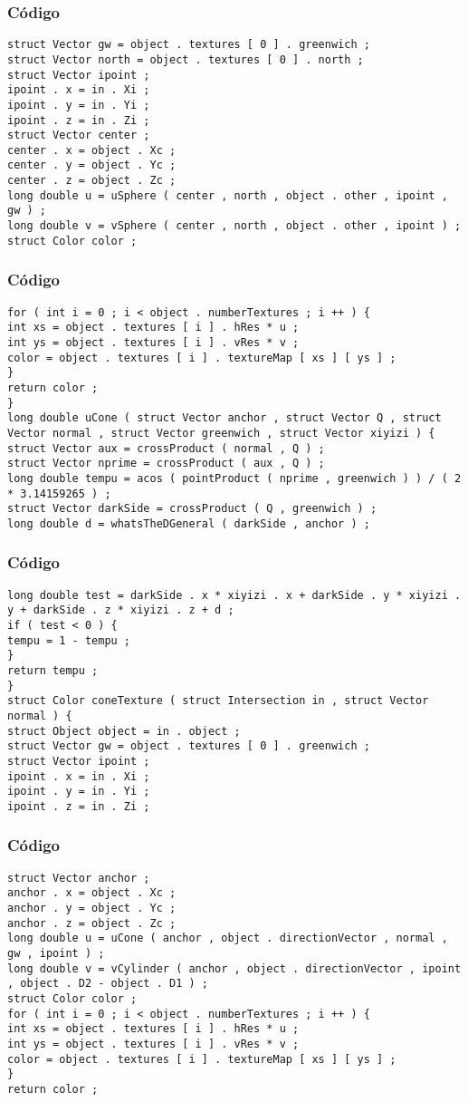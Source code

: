 \documentclass{beamer}
\begin{document}
\begin{frame}[fragile]
\frametitle{C\'odigo}
\begin{verbatim}
struct Vector gw = object . textures [ 0 ] . greenwich ; 
struct Vector north = object . textures [ 0 ] . north ; 
struct Vector ipoint ; 
ipoint . x = in . Xi ; 
ipoint . y = in . Yi ; 
ipoint . z = in . Zi ; 
struct Vector center ; 
center . x = object . Xc ; 
center . y = object . Yc ; 
center . z = object . Zc ; 
long double u = uSphere ( center , north , object . other , ipoint , gw ) ; 
long double v = vSphere ( center , north , object . other , ipoint ) ; 
struct Color color ; 
\end{verbatim}
\end{frame}
\begin{frame}[fragile]
\frametitle{C\'odigo}
\begin{verbatim}
for ( int i = 0 ; i < object . numberTextures ; i ++ ) { 
int xs = object . textures [ i ] . hRes * u ; 
int ys = object . textures [ i ] . vRes * v ; 
color = object . textures [ i ] . textureMap [ xs ] [ ys ] ; 
} 
return color ; 
} 
long double uCone ( struct Vector anchor , struct Vector Q , struct Vector normal , struct Vector greenwich , struct Vector xiyizi ) { 
struct Vector aux = crossProduct ( normal , Q ) ; 
struct Vector nprime = crossProduct ( aux , Q ) ; 
long double tempu = acos ( pointProduct ( nprime , greenwich ) ) / ( 2 * 3.14159265 ) ; 
struct Vector darkSide = crossProduct ( Q , greenwich ) ; 
long double d = whatsTheDGeneral ( darkSide , anchor ) ; 
\end{verbatim}
\end{frame}
\begin{frame}[fragile]
\frametitle{C\'odigo}
\begin{verbatim}
long double test = darkSide . x * xiyizi . x + darkSide . y * xiyizi . y + darkSide . z * xiyizi . z + d ; 
if ( test < 0 ) { 
tempu = 1 - tempu ; 
} 
return tempu ; 
} 
struct Color coneTexture ( struct Intersection in , struct Vector normal ) { 
struct Object object = in . object ; 
struct Vector gw = object . textures [ 0 ] . greenwich ; 
struct Vector ipoint ; 
ipoint . x = in . Xi ; 
ipoint . y = in . Yi ; 
ipoint . z = in . Zi ; 
\end{verbatim}
\end{frame}
\begin{frame}[fragile]
\frametitle{C\'odigo}
\begin{verbatim}
struct Vector anchor ; 
anchor . x = object . Xc ; 
anchor . y = object . Yc ; 
anchor . z = object . Zc ; 
long double u = uCone ( anchor , object . directionVector , normal , gw , ipoint ) ; 
long double v = vCylinder ( anchor , object . directionVector , ipoint , object . D2 - object . D1 ) ; 
struct Color color ; 
for ( int i = 0 ; i < object . numberTextures ; i ++ ) { 
int xs = object . textures [ i ] . hRes * u ; 
int ys = object . textures [ i ] . vRes * v ; 
color = object . textures [ i ] . textureMap [ xs ] [ ys ] ; 
} 
return color ; 
\end{verbatim}
\end{frame}
\end{document}
